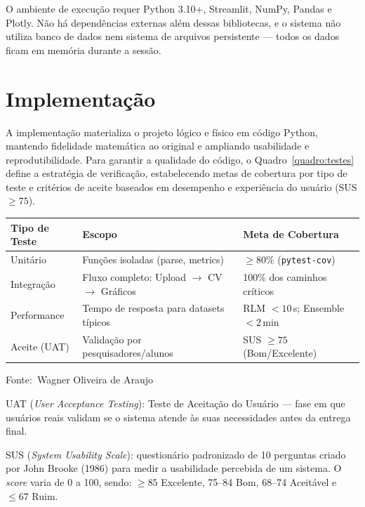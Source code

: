 \documentclass[12pt,a4paper]{article}
\newcommand{\oautor}{Wagner Oliveira de Araujo}
\begin{document}
O ambiente de execução requer Python 3.10+, Streamlit, NumPy, Pandas e Plotly. Não há dependências externas além dessas bibliotecas, e o sistema não utiliza banco de dados nem sistema de arquivos persistente --- todos os dados ficam em memória durante a sessão.

\newpage
\section{Implementação}

A implementação materializa o projeto lógico e físico em código Python, mantendo fidelidade matemática ao original e ampliando usabilidade e reprodutibilidade. Para garantir a qualidade do código, o Quadro~\ref{quadro:testes} define a estratégia de verificação, estabelecendo metas de cobertura por tipo de teste e critérios de aceite baseados em desempenho e experiência do usuário (SUS $\ge 75$).

\begin{quadro}[ht]
\centering
\small
\caption{Estratégia de testes e critérios de aceite}
\label{quadro:testes}
\begin{threeparttable}
\begin{tabularx}{\textwidth}{|l|X|X|} \hline
\textbf{Tipo de Teste} & \textbf{Escopo} & \textbf{Meta de Cobertura} \\ \hline
Unitário & Funções isoladas (parse, metrics) & $\ge 80\%$ (\texttt{pytest-cov}) \\ \hline
Integração & Fluxo completo: Upload $\rightarrow$ CV $\rightarrow$ Gráficos & 100\% dos caminhos críticos \\ \hline
Performance & Tempo de resposta para datasets típicos & RLM $< 10\,$s; Ensemble $< 2\,$min \\ \hline
Aceite (UAT)\tnote{a} & Validação por pesquisadores/alunos & SUS\tnote{b} $\ge 75$ (Bom/Excelente) \\ \hline
\end{tabularx}
\begin{tablenotes}[flushleft]
\footnotesize
\item Fonte:~\oautor
\item[\textit{a}] UAT (\textit{User Acceptance Testing}): Teste de Aceitação do Usuário --- fase em que usuários reais validam se o sistema atende às suas necessidades antes da entrega final.
\item[\textit{b}] SUS (\textit{System Usability Scale}): questionário padronizado de 10 perguntas criado por John Brooke (1986) para medir a usabilidade percebida de um sistema. O \textit{score} varia de 0 a 100, sendo: $\ge 85$ Excelente, 75--84 Bom, 68--74 Aceitável e $\le 67$ Ruim.
\end{tablenotes}
\end{threeparttable}
\end{quadro}
\end{document}
